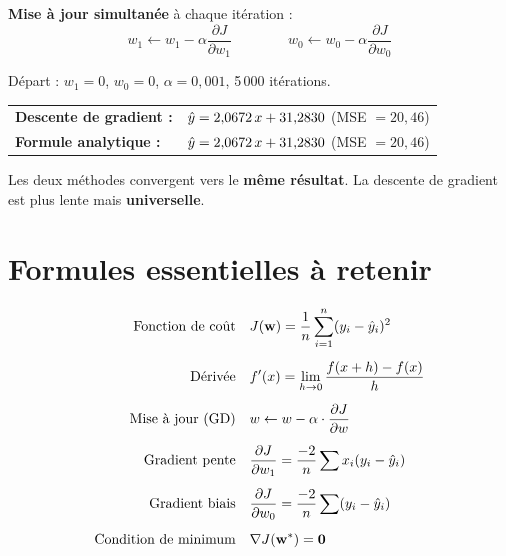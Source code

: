 \textbf{Mise \`{a} jour simultan\'{e}e} \`{a} chaque it\'{e}ration :
\[
    w_1 \leftarrow w_1 - \alpha \frac{\partial J}{\partial w_1}
    \qquad\qquad
    w_0 \leftarrow w_0 - \alpha \frac{\partial J}{\partial w_0}
\]

\begin{exemplebox}
    D\'{e}part : $w_1 = 0$, $w_0 = 0$, $\alpha = 0{,}001$, 5\,000 it\'{e}rations.

    \medskip
    \begin{tabular}{l l}
        \textbf{Descente de gradient :} & $\hat{y} = 2{,}0672 \, x + 31{,}2830$ \quad (MSE $= 20{,}46$) \\
        \textbf{Formule analytique :}   & $\hat{y} = 2{,}0672 \, x + 31{,}2830$ \quad (MSE $= 20{,}46$) \\
    \end{tabular}

    \medskip
    Les deux m\'{e}thodes convergent vers le \textbf{m\^{e}me r\'{e}sultat}.
    La descente de gradient est plus lente mais \textbf{universelle}.
\end{exemplebox}

\section{Formules essentielles \`{a} retenir}

\begin{tcolorbox}[
    enhanced, colback=ipssiBleu!3, colframe=ipssiBleu!40, boxrule=1pt, arc=4pt,
    title={\sffamily\bfseries Formules du Jour 2}, coltitle=white, colbacktitle=ipssiBleu!70,
]
\begin{align}
    \text{Fonction de co\^{u}t}\quad
        & J(\mathbf{w}) = \frac{1}{n} \sum_{i=1}^{n} (y_i - \hat{y}_i)^2
        \label{eq:f-cout} \\[5pt]
    \text{D\'{e}riv\'{e}e}\quad
        & f'(x) = \lim_{h\to 0} \frac{f(x+h)-f(x)}{h}
        \label{eq:f-deriv} \\[5pt]
    \text{Mise \`{a} jour (GD)}\quad
        & w \leftarrow w - \alpha \cdot \frac{\partial J}{\partial w}
        \label{eq:f-gd} \\[5pt]
    \text{Gradient pente}\quad
        & \frac{\partial J}{\partial w_1} = \frac{-2}{n}\sum x_i(y_i - \hat{y}_i)
        \label{eq:f-dw1} \\[5pt]
    \text{Gradient biais}\quad
        & \frac{\partial J}{\partial w_0} = \frac{-2}{n}\sum (y_i - \hat{y}_i)
        \label{eq:f-dw0} \\[5pt]
    \text{Condition de minimum}\quad
        & \nabla J(\mathbf{w}^*) = \mathbf{0}
        \label{eq:f-min}
\end{align}
\end{tcolorbox}

